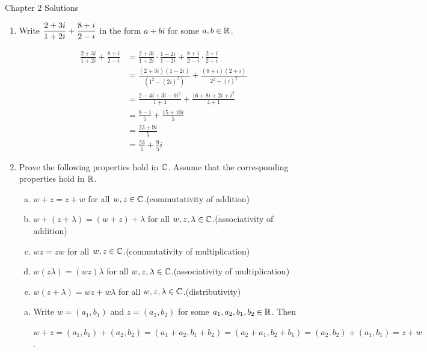 \documentclass[11pt,fleqn,dvipsnames,usenames]{article}
\renewcommand{\headrulewidth}{1pt}
\begin{document}
\fancyhead[L]{\course}
\fancyhead[R]{\term}
\renewcommand{\headrulewidth}{0.4pt}

{\huge Chapter 2 Solutions}
\vsp

\begin{enumerate}
\item Write $\displaystyle{\frac{2 + 3i}{1 + 2i} + \frac{8+i}{2-i}}$ in the form $a+bi$ for some $a,b\in\mathbb{R}$.
\vsmsp

\solution
\begin{align*}
\frac{2 + 3i}{1 + 2i} + \frac{8+i}{2-i} &= \frac{2 + 3i}{1 + 2i}\cdot\frac{1 - 2i}{1-2i} + \frac{8+i}{2-i}\cdot \frac{2+i}{2+i}\\
&= \frac{(2+3i)(1-2i)}{(1^2 - (2i)^2)} + \frac{(8+i)(2+i)}{2^2 - (i)^2}\\
&= \frac{2 -4i +3i -6i^2}{1 + 4} + \frac{16 + 8i + 2i + i^2}{4 + 1}\\
&= \frac{8 - i}{5} + \frac{15 + 10i}{5}\\
&= \frac{23 + 9i}{5}\\
&= \frac{23}{5} + \frac{9}{5}i
\end{align*}

\item Prove the following properties hold in $\mathbb{C}$.  Assume that the corresponding properties hold in $\mathbb{R}$.
\begin{enumerate}[(a)]
\item $w + z = z + w$ for all $w,z\in\mathbb{C}$.\hfill (commutativity of addition)
\item $w + (z + \lambda) = (w + z) + \lambda$ for all $w,z,\lambda\in\mathbb{C}$.\hfill (associativity of addition)
\item $wz = zw$ for all $w,z\in\mathbb{C}$.\hfill (commutativity of multiplication)
\item $w(z\lambda) = (wz)\lambda$ for all $w,z,\lambda\in\mathbb{C}$.\hfill (associativity of multiplication)
\item $w(z + \lambda) = wz + w\lambda$ for all $w,z,\lambda\in\mathbb{C}$.\hfill (distributivity)
\end{enumerate}
\vsmsp

\solution 
\begin{enumerate}[(a)]
\item Write $w = (a_{1},b_{1})$ and $z = (a_{2},b_{2})$ for some $a_{1},a_{2},b_{1},b_{2}\in\mathbb{R}$.  Then
\begin{center}
$w + z = (a_{1},b_{1}) + (a_{2},b_{2}) = (a_{1} + a_{2}, b_{1} + b_{2}) = (a_{2} + a_{1}, b_{2} + b_{1}) = (a_{2},b_{2}) + (a_{1},b_{1}) = z + w$.
\end{center}


\end{enumerate}
\end{enumerate}
\end{document}

